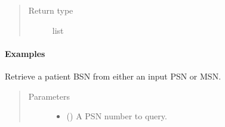 \documentclass[letterpaper,10pt,english]{sphinxmanual}
\begin{document}
\begin{fulllineitems}
\begin{fulllineitems}
\begin{quote}
\begin{description}
\item[{Return type}] \leavevmode
list

\end{description}\end{quote}
\paragraph{Examples}

%
\begin{sphinxVerbatim}[commandchars=\\\{\}]
\end{sphinxVerbatim}

%
\begin{sphinxVerbatim}[commandchars=\\\{\}]
\end{sphinxVerbatim}

%
\begin{sphinxVerbatim}[commandchars=\\\{\}]
\end{sphinxVerbatim}

\end{fulllineitems}


\begin{fulllineitems}
\label{\detokenize{matchbox_api_utils:matchbox_api_utils.match_data.MatchData.get_bsn}}
Retrieve a patient BSN from either an input PSN or MSN.
\begin{quote}\begin{description}
\item[{Parameters}] \leavevmode\begin{itemize}
\item {} 
 () \textendash{} A PSN number to query.


\end{itemize}
\end{description}
\end{quote}
\end{fulllineitems}
\end{fulllineitems}
\end{document}
